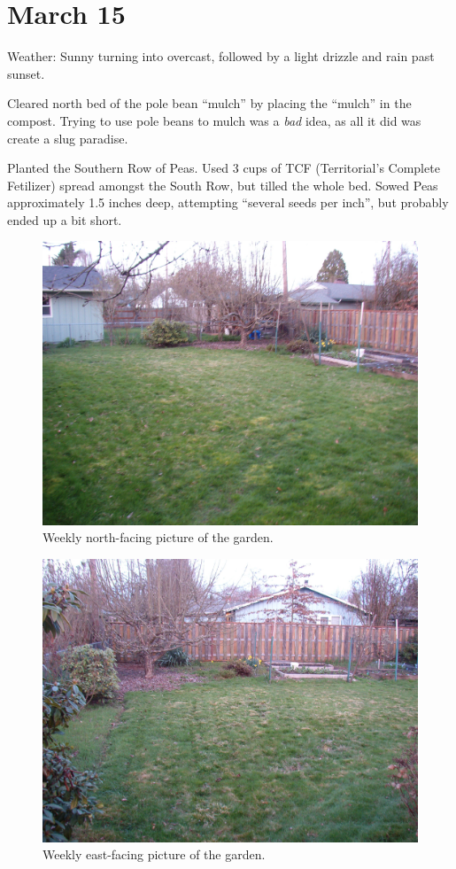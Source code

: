 \documentclass{article}
\begin{document}
\section*{March 15}
Weather: Sunny turning into overcast, followed by a light drizzle and rain past sunset.

Cleared north bed of the pole bean ``mulch'' by placing the ``mulch'' in the compost. Trying to use pole beans to mulch was a \textit{bad} idea, as all it did was create a slug paradise.

Planted the Southern Row of Peas. Used 3 cups of TCF (Territorial's Complete Fetilizer) spread amongst the South Row, but tilled the whole bed. Sowed Peas approximately 1.5 inches deep, attempting ``several seeds per inch'', but probably ended up a bit short.

\begin{figure}
\protect \includegraphics[scale=0.20]{pics/0315_garden1.jpg}
\caption{Weekly north-facing picture of the garden.}
\end{figure}
\begin{figure}
\protect \includegraphics[scale=0.20]{pics/0315_garden2.jpg}
\caption{Weekly east-facing picture of the garden.}
\end{figure}
\end{document}
